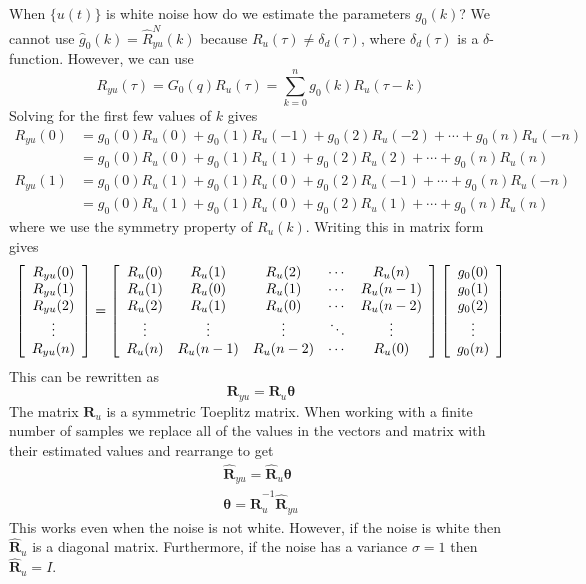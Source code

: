 When $\{u(t)\}$ is white noise how do we estimate the parameters $g_0(k)$? We cannot use $\hat{g}_0(k) = \hat{R}_{yu}^N(k)$ because $R_u(\tau)\neq \delta_d(\tau)$, where $\delta_d(\tau)$ is a $\delta$-function. However, we can use
$$R_{yu}(\tau) = G_0(q)R_u(\tau) = \sum_{k=0}^ng_0(k)R_u(\tau-k)$$
Solving for the first few values of $k$ gives
\begin{align*}
R_{yu}(0) &= g_0(0)R_u(0) + g_0(1)R_u(-1) + g_0(2)R_u(-2) + \cdots + g_0(n)R_u(-n) \\
&= g_0(0)R_u(0) + g_0(1)R_u(1) + g_0(2)R_u(2) + \cdots + g_0(n)R_u(n) \\
R_{yu}(1) &= g_0(0)R_u(1) + g_0(1)R_u(0) + g_0(2)R_u(-1) + \cdots + g_0(n)R_u(-n) \\
&= g_0(0)R_u(1) + g_0(1)R_u(0) + g_0(2)R_u(1) + \cdots + g_0(n)R_u(n)
\end{align*}
where we use the symmetry property of $R_u(k)$. Writing this in matrix form gives
\begin{align*}
\left[\begin{array}{c}
R_{yu}(0) \\ R_{yu}(1) \\ R_{yu}(2) \\ \vdots \\ R_{yu}(n)
\end{array}\right] =
\left[\begin{array}{c c c c c}
R_u(0) & R_u(1) & R_u(2) & \cdots & R_u(n) \\
R_u(1) & R_u(0) & R_u(1) & \cdots & R_u(n-1) \\
R_u(2) & R_u(1) & R_u(0) & \cdots & R_u(n-2) \\
\vdots & \vdots & \vdots & \ddots & \vdots \\
R_u(n) & R_u(n-1) & R_u(n-2) & \cdots & R_u(0)
\end{array}\right]
\left[\begin{array}{c}
g_0(0) \\ g_0(1) \\ g_0(2) \\ \vdots \\ g_0(n)
\end{array}\right]
\end{align*}
This can be rewritten as
$$\mathbf{R}_{yu} = \mathbf{R}_u\mathbf{\theta}$$
The matrix $\mathbf{R}_u$ is a symmetric Toeplitz matrix. When working with a finite number of samples we replace all of the values in the vectors and matrix with their estimated values and rearrange to get
\begin{align*}
\hat{\mathbf{R}}_{yu} = \hat{\mathbf{R}}_u\mathbf{\theta} \\
\mathbf{\theta} = \hat{\mathbf{R}}_u^{-1}\hat{\mathbf{R}}_{yu}
\end{align*}
This works even when the noise is not white. However, if the noise is white then $\hat{\mathbf{R}}_u$ is a diagonal matrix. Furthermore, if the noise has a variance $\sigma=1$ then $\hat{\mathbf{R}}_u=I$.

